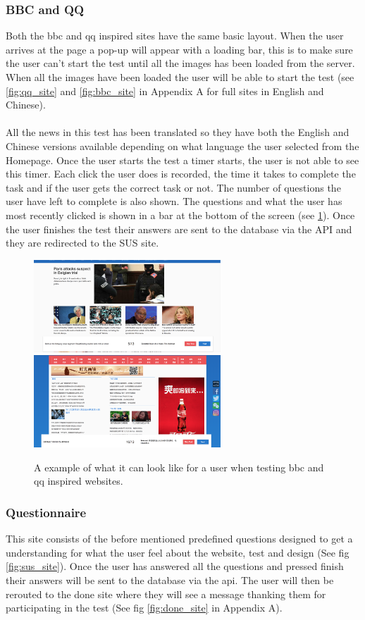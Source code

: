 \subsubsection{BBC and QQ}
Both the bbc and qq inspired sites have the same basic layout. When the user arrives at the page a pop-up will appear with a loading bar, this is to make sure the user can't start the test until all the images has been loaded from the server. When all the images have been loaded the user will be able to start the test (see \ref{fig:qq_site} and \ref{fig:bbc_site} in Appendix A for full sites in English and Chinese).  
\\\\
All the news in this test has been translated so they have both the English and Chinese versions available depending on what language the user selected from the Homepage. Once the user starts the test a timer starts, the user is not able to see this timer. Each click the user does is recorded, the time it takes to complete the task and if the user gets the correct task or not. The number of questions the user have left to complete is also shown. The questions and what the user has most recently clicked is shown in a bar at the bottom of the screen (see \ref{fig:user_view}). Once the user finishes the test their answers are sent to the database via the API and they are redirected to the SUS site. 
\begin{figure}[h]
	\centering
	\includegraphics[width=70mm]{Images/view_bbc.png}
	\includegraphics[width=70mm]{Images/view_qq.png}
	\decoRule
	\caption[Users View]{A example of what it can look like for a user when testing bbc and qq inspired websites.}
	\label{fig:user_view}
\end{figure}


\subsubsection{Questionnaire}
This site consists of the before mentioned predefined questions designed to get a understanding for what the user feel about the website, test and design (See fig \ref{fig:sus_site}). Once the user has answered all the questions and pressed finish their answers will be sent to the database via the api. The user will then be rerouted to the done site where they will see a message thanking them for participating in the test (See fig \ref{fig:done_site} in Appendix A).
\newpage


